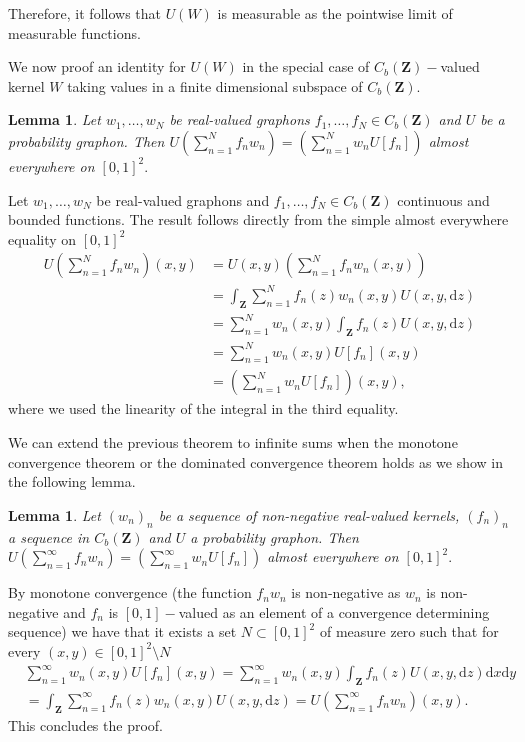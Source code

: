 \documentclass[11pt]{article}
\newtheorem{lemma}[theorem]{Lemma}
\newcommand{\Space}{\mathbf{Z}}
\newcommand{\CbFunct}{C_b(\Space)}
\begin{document}
Therefore, it follows that $U(W)$ is measurable as the pointwise limit of measurable functions. 
\endproof

We now proof an identity for $U(W)$ in the special case of $\CbFunct-$valued kernel $W$ taking values in a finite dimensional subspace of $\CbFunct.$


\begin{lemma}\label{ProprLinearProbGraphons}
Let $w_1,\ldots, w_N$ be real-valued graphons $f_1,\ldots , f_N\in\CbFunct$ and $U$ be a probability graphon.  Then $U(\sum^{N}_{n=1}f_n w_n)=(\sum^{N}_{n=1} w_nU[f_n])$ almost everywhere on $[0,1]^2.$
\end{lemma}
\proof
Let $w_1,\ldots, w_N$ be real-valued graphons and $f_1,\ldots,f_N \in \CbFunct$ continuous and bounded functions. The result follows directly from the simple almost everywhere equality on $[0,1]^2$
$$\begin{aligned}
U(\sum^{N}_{n=1}f_n w_n)(x,y)&= U(x,y)(\sum^{N}_{n=1}f_n w_n(x,y))\\
&=\int_{\Space}\sum^{N}_{n=1}f_n(z) w_n(x,y)U(x,y,\mathrm{d}z)
\\
& =\sum^{N}_{n=1}w_n(x,y)\int_{\Space}f_n(z) U(x,y,\mathrm{d}z)
\\ &=\sum^{N}_{n=1} w_n(x,y)U[f_n](x,y)\\ &=(\sum^{N}_{n=1} w_nU[f_n])(x,y),
\end{aligned}
$$
where we used the linearity of the integral in the third equality.
\endproof

We can extend the previous theorem to infinite sums when the monotone convergence theorem or the dominated convergence theorem holds as we show in the following lemma.

\begin{lemma}
    Let $(w_n)_n$ be a sequence of non-negative real-valued kernels, $(f_n)_n$ a sequence in $\CbFunct$ and $U$ a probability graphon. Then $U(\sum^{\infty}_{n=1}f_n w_n)=(\sum^{\infty}_{n=1} w_nU[f_n])$ almost everywhere on $[0,1]^2.$
\end{lemma}
\proof
By monotone convergence (the function $f_nw_n$ is non-negative as $w_n$ is non-negative and $f_n$ is $[0,1]-$valued as an element of a convergence determining sequence) we have that it exists a set $N\subset [0,1]^2$ of measure zero such that for every $(x,y)\in [0,1]^2\setminus N$
$$
\begin{aligned}
&\sum^{\infty}_{n=1}w_n(x,y)U[f_n](x,y) =\sum^{\infty}_{n=1}w_n(x,y) \int_{\Space}f_n(z)U(x,y,\mathrm{d}z)\mathrm{d} x \mathrm{d} y\\
&= \int_{\Space}\sum^{\infty}_{n=1}  f_n(z)w_n(x,y)U(x,y,\mathrm{d}z)= U(\sum^{\infty}_{n=1} f_n w_n)(x,y).
\end{aligned}
$$
This concludes the proof.
\endproof
\end{document}
